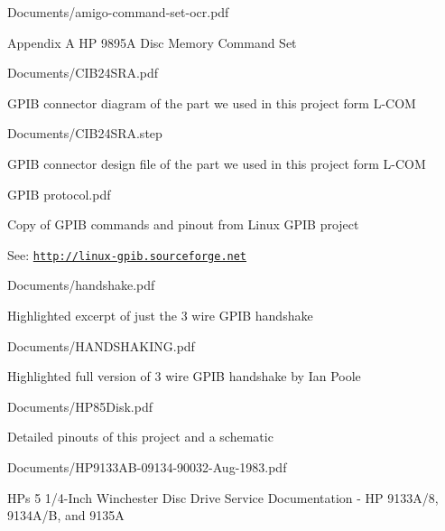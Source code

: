 \begin{DoxyItemize}
\begin{DoxyItemize}
\end{DoxyItemize}
\item Documents/amigo-\/command-\/set-\/ocr.\+pdf
\begin{DoxyItemize}
\item Appendix A HP 9895A Disc Memory Command Set
\end{DoxyItemize}
\item Documents/\+C\+I\+B24\+S\+R\+A.\+pdf
\begin{DoxyItemize}
\item G\+P\+IB connector diagram of the part we used in this project form L-\/\+C\+OM
\end{DoxyItemize}
\item Documents/\+C\+I\+B24\+S\+R\+A.\+step
\begin{DoxyItemize}
\item G\+P\+IB connector design file of the part we used in this project form L-\/\+C\+OM
\end{DoxyItemize}
\item G\+P\+IB protocol.\+pdf
\begin{DoxyItemize}
\item Copy of G\+P\+IB commands and pinout from Linux G\+P\+IB project
\item See\+: \href{http://linux-gpib.sourceforge.net}{\tt http\+://linux-\/gpib.\+sourceforge.\+net}
\end{DoxyItemize}
\item Documents/handshake.\+pdf
\begin{DoxyItemize}
\item Highlighted excerpt of just the 3 wire G\+P\+IB handshake
\end{DoxyItemize}
\item Documents/\+H\+A\+N\+D\+S\+H\+A\+K\+I\+N\+G.\+pdf
\begin{DoxyItemize}
\item Highlighted full version of 3 wire G\+P\+IB handshake by Ian Poole
\end{DoxyItemize}
\item Documents/\+H\+P85\+Disk.\+pdf
\begin{DoxyItemize}
\item Detailed pinouts of this project and a schematic
\end{DoxyItemize}
\item Documents/\+H\+P9133\+A\+B-\/09134-\/90032-\/\+Aug-\/1983.\+pdf
\begin{DoxyItemize}
\item H\+Ps 5 1/4-\/\+Inch Winchester Disc Drive Service Documentation -\/ HP 9133\+A/8, 9134\+A/B, and 9135A

\end{DoxyItemize}
\end{DoxyItemize}
